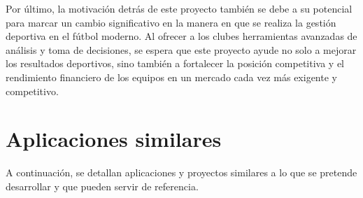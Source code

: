 Por último, la motivación detrás de este proyecto también se debe a su potencial para marcar un cambio significativo en la manera en que se realiza la gestión deportiva en el fútbol moderno. Al ofrecer a los clubes herramientas avanzadas de análisis y toma de decisiones, se espera que este proyecto ayude no solo a mejorar los resultados deportivos, sino también a fortalecer la posición competitiva y el rendimiento financiero de los equipos en un mercado cada vez más exigente y competitivo.













\section{Aplicaciones similares}
A continuación, se detallan aplicaciones y proyectos similares a lo que se pretende desarrollar y que pueden servir de referencia.
